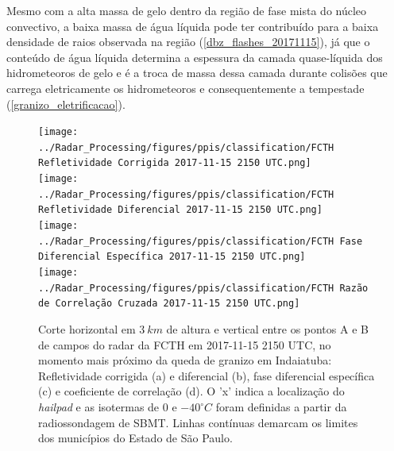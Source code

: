 Mesmo com a alta massa de gelo dentro da região de fase mista do núcleo convectivo, a baixa massa de água líquida pode ter contribuído para a baixa densidade de raios observada na região (\autoref{dbz_flashes_20171115}), já que o conteúdo de água líquida determina a espessura da camada quase-líquida dos hidrometeoros de gelo e é a troca de massa dessa camada durante colisões que carrega eletricamente os hidrometeoros e consequentemente a tempestade (\autoref{granizo_eletrificacao}).

\begin{figure}[hp]
	\centering
	\caption{Corte horizontal em $3\:km$ de altura e vertical entre os pontos A e B de campos do radar da FCTH em 2017-11-15 2150 UTC, no momento mais próximo da queda de granizo em Indaiatuba: Refletividade corrigida (a) e diferencial (b), fase diferencial específica (c) e coeficiente de correlação (d). O 'x' indica a localização do \textit{hailpad} e as isotermas de $0$ e $-40^{\circ}C$ foram definidas a partir da radiossondagem de SBMT. Linhas contínuas demarcam os limites dos municípios do Estado de São Paulo.}
	\label{radar_20171115}
	\vspace{-5pt}
	\texttt{[image: ../Radar\_Processing/figures/ppis/classification/FCTH Refletividade Corrigida 2017-11-15 2150 UTC.png]} \\
	\vspace{-5pt}
	\texttt{[image: ../Radar\_Processing/figures/ppis/classification/FCTH Refletividade Diferencial 2017-11-15 2150 UTC.png]} \\
	\vspace{-5pt}
	\texttt{[image: ../Radar\_Processing/figures/ppis/classification/FCTH Fase Diferencial Específica 2017-11-15 2150 UTC.png]} \\
	\vspace{-5pt}
	\texttt{[image: ../Radar\_Processing/figures/ppis/classification/FCTH Razão de Correlação Cruzada 2017-11-15 2150 UTC.png]} \\
\end{figure}

